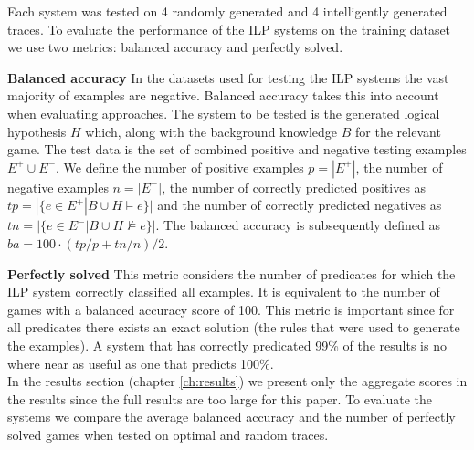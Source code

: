 Each system was tested on 4 randomly generated and 4 intelligently generated traces. To evaluate the performance of the ILP systems on the training dataset we use two metrics: balanced accuracy and perfectly solved.

\textbf{Balanced accuracy} In the datasets used for testing the ILP systems the vast majority of examples are negative. Balanced accuracy takes this into account when evaluating approaches. The system to be tested is the generated logical hypothesis $H$ which, along with the background knowledge $B$ for the relevant game. The test data is the set of combined positive and negative testing examples $E^+ \cup E^-$. We define the number of positive examples $p = |E^+|$, the number of negative examples $n = |E^-|$, the number of correctly predicted positives as $tp = |\{e\in E^+|B\cup H \models e\}|$ and the number of correctly predicted negatives as $tn = |\{e\in E^-|B\cup H \not\models e\}|$. The balanced accuracy is subsequently defined as $ba = 100 \cdot (tp/p + tn/n)/2$.

\textbf{Perfectly solved} This metric considers the number of predicates for which the ILP system correctly classified all examples. It is equivalent to the number of games with a balanced accuracy score of 100. This metric is important since for all predicates there exists an exact solution (the rules that were used to generate the examples). A system that has correctly predicated 99\% of the results is no where near as useful as one that predicts 100\%.
\\

In the results section (chapter \ref{ch:results}) we present only the aggregate scores in the results since the full results are too large for this paper. To evaluate the systems we compare the average balanced accuracy and the number of perfectly solved games when tested on optimal and random traces.


